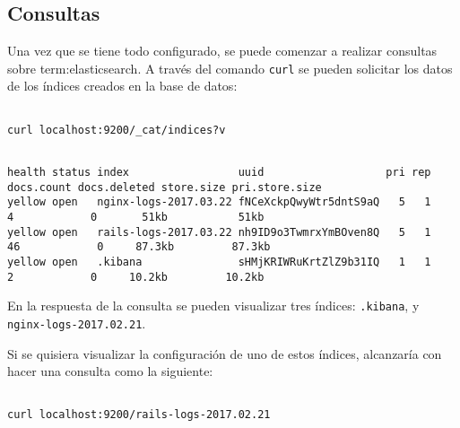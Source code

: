 \subsection{Consultas}
\label{consultas}

Una vez que se tiene todo configurado, se puede comenzar a realizar consultas
sobre \gls{term:elasticsearch}. A través del comando \texttt{curl} se pueden
solicitar los datos de los índices creados en la base de datos:

\begin{lstlisting}

curl localhost:9200/_cat/indices?v

\end{lstlisting}

\begin{lstlisting}

health status index                 uuid                   pri rep docs.count docs.deleted store.size pri.store.size
yellow open   nginx-logs-2017.03.22 fNCeXckpQwyWtr5dntS9aQ   5   1          4            0       51kb           51kb
yellow open   rails-logs-2017.03.22 nh9ID9o3TwmrxYmBOven8Q   5   1         46            0     87.3kb         87.3kb
yellow open   .kibana               sHMjKRIWRuKrtZlZ9b31IQ   1   1          2            0     10.2kb         10.2kb

\end{lstlisting}

En la respuesta de la consulta se pueden visualizar tres índices:
\texttt{.kibana},  y
\texttt{nginx-logs-2017.02.21}.

Si se quisiera visualizar la configuración de uno de estos índices, alcanzaría
con hacer una consulta como la siguiente:

\begin{lstlisting}

curl localhost:9200/rails-logs-2017.02.21

\end{lstlisting}

